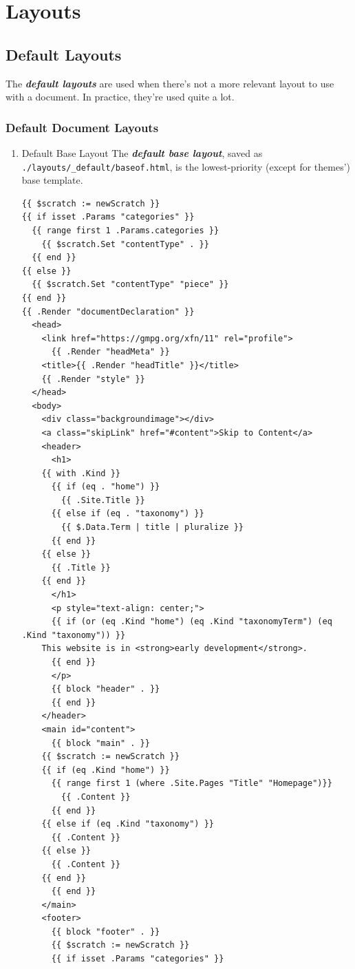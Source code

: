 \documentclass[11pt]{article}
\begin{document}
\section{Layouts}
\label{sec:orgf8c8d35}
\subsection{Default Layouts}
\label{sec:orgc3dc670}
The \textbf{\emph{default layouts}} are used when there's not a more relevant
layout to use with a document. In practice, they're used quite a lot.
\subsubsection{Default Document Layouts}
\label{sec:org311696e}
\begin{enumerate}
\item Default Base Layout
\label{sec:orgd697ca8}
The \textbf{\emph{default base layout}}, saved as
\texttt{./layouts/\_default/baseof.html}, is the lowest-priority (except for
themes') base template.
\begin{verbatim}
{{ $scratch := newScratch }}
{{ if isset .Params "categories" }}
  {{ range first 1 .Params.categories }}
    {{ $scratch.Set "contentType" . }}
  {{ end }}
{{ else }}
  {{ $scratch.Set "contentType" "piece" }}
{{ end }}
{{ .Render "documentDeclaration" }}
  <head>
    <link href="https://gmpg.org/xfn/11" rel="profile">
      {{ .Render "headMeta" }}
    <title>{{ .Render "headTitle" }}</title>
    {{ .Render "style" }}
  </head>
  <body>
    <div class="backgroundimage"></div>
    <a class="skipLink" href="#content">Skip to Content</a>
    <header>
      <h1>
	{{ with .Kind }}
	  {{ if (eq . "home") }}
	    {{ .Site.Title }}
	  {{ else if (eq . "taxonomy") }}
	    {{ $.Data.Term | title | pluralize }}
	  {{ end }}
	{{ else }}
	  {{ .Title }}
	{{ end }}
      </h1>
      <p style="text-align: center;">
      {{ if (or (eq .Kind "home") (eq .Kind "taxonomyTerm") (eq .Kind "taxonomy")) }}
	This website is in <strong>early development</strong>.
      {{ end }}
      </p>
      {{ block "header" . }}
      {{ end }}
    </header>
    <main id="content">
      {{ block "main" . }}
	{{ $scratch := newScratch }}
	{{ if (eq .Kind "home") }}
	  {{ range first 1 (where .Site.Pages "Title" "Homepage")}}
	    {{ .Content }}
	  {{ end }}
	{{ else if (eq .Kind "taxonomy") }}
	  {{ .Content }}
	{{ else }}
	  {{ .Content }}
	{{ end }}
      {{ end }}
    </main>
    <footer>
      {{ block "footer" . }}
      {{ $scratch := newScratch }}
      {{ if isset .Params "categories" }}

\end{verbatim}
\end{enumerate}
\end{document}

